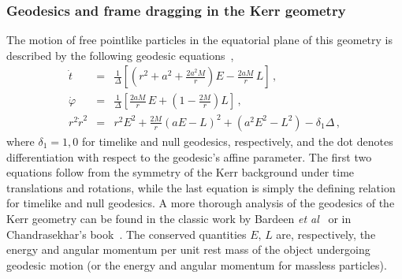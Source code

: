 \documentclass[11pt]{article}
\def\beq{\begin{eqnarray}}
\def\eeq{\end{eqnarray}}
\numberwithin{equation}{section} %
\begin{document}
\subsubsection{Geodesics and frame dragging in the Kerr geometry}\label{sec:ZAMO}
The motion of free pointlike particles in the equatorial plane of this geometry is described by the following geodesic equations~\cite{Bardeen:1972fi,Chandra},
%
\beq
%
\dot{t}&=&\frac{1}{\Delta}\left[\left(r^2+a^2+\frac{2a^2M}{r}\right)E-\frac{2aM}{r}\,L\right]\,,\label{geodesics:kerrt}\\
%
\dot{\varphi}&=&\frac{1}{\Delta}\left[\frac{2aM}{r}\,E+\left(1-\frac{2M}{r}\right)L\right]\,,\label{geodesics:kerrphi}\\
%
r^2\dot{r}^2&=&r^2E^2+\frac{2M}{r}(aE-L)^2+(a^2E^2-L^2)-\delta_1\Delta\,,\label{geodesics:kerr}
%
\eeq
%
where $\delta_1=1,0$ for timelike and null geodesics, respectively, and the dot denotes differentiation with respect to the geodesic's affine parameter. The first two equations follow from the symmetry of the Kerr background under time translations and rotations, while the last equation is simply the defining relation for timelike and null geodesics. A more thorough analysis
of the geodesics of the Kerr geometry can be found in the classic work by Bardeen {\it et al}~\cite{Bardeen:1972fi} or in Chandrasekhar's book~\cite{Chandra}. The conserved quantities $E,\,L$ are, respectively, the energy and angular momentum per unit rest mass of the object undergoing geodesic motion (or the energy and angular momentum for massless particles).
\end{document}
